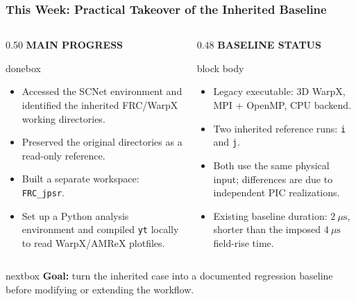 \documentclass[aspectratio=169,11pt]{beamer}
\newcommand{\smallcapslabel}[1]{%
    {\scriptsize\bfseries\color{myblue}\MakeUppercase{#1}}%
}
\begin{document}
\begin{frame}
\frametitle{This Week: Practical Takeover of the Inherited Baseline}

\begin{columns}[T,totalwidth=\textwidth]
    \begin{column}{0.50\textwidth}
        \smallcapslabel{Main progress}
        \vspace{0.06cm}
        \begin{beamercolorbox}[wd=\linewidth,rounded=true,sep=0.55em]{donebox}
        \small
        \begin{itemize}\setlength\itemsep{0.12cm}
            \item Accessed the SCNet environment and identified the inherited FRC/WarpX working directories.
            \item Preserved the original directories as a read-only reference.
            \item Built a separate workspace: \texttt{FRC\_jpsr}.
            \item Set up a Python analysis environment and compiled \texttt{yt} locally to read WarpX/AMReX plotfiles.
        \end{itemize}
        \end{beamercolorbox}
    \end{column}

    \begin{column}{0.48\textwidth}
        \smallcapslabel{Baseline status}
        \vspace{0.06cm}
        \begin{beamercolorbox}[wd=\linewidth,rounded=true,sep=0.55em]{block body}
        \small
        \begin{itemize}\setlength\itemsep{0.12cm}
            \item Legacy executable: 3D WarpX, MPI + OpenMP, CPU backend.
            \item Two inherited reference runs: \texttt{i} and \texttt{j}.
            \item Both use the same physical input; differences are due to independent PIC realizations.
            \item Existing baseline duration: \(2~\mu\mathrm{s}\), shorter than the imposed \(4~\mu\mathrm{s}\) field-rise time.
        \end{itemize}
        \end{beamercolorbox}
    \end{column}
\end{columns}

\vspace{0.16cm}
\begin{beamercolorbox}[wd=\textwidth,rounded=true,sep=0.44em]{nextbox}
{\scriptsize\textbf{Goal:} turn the inherited case into a documented regression baseline before modifying or extending the workflow.}
\end{beamercolorbox}

\end{frame}
\end{document}
